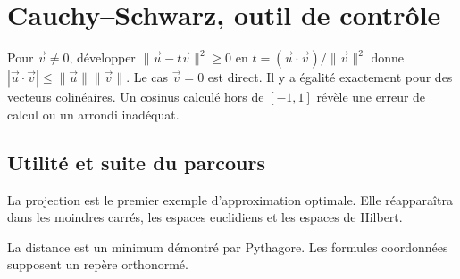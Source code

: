 \documentclass[../cours_tle.tex]{subfiles}
\begin{document}
\section{Cauchy--Schwarz, outil de contrôle}
Pour $\vec v\ne0$, développer $\|\vec u-t\vec v\|^2\ge0$ en
$t=(\vec u\cdot\vec v)/\|\vec v\|^2$ donne
$|\vec u\cdot\vec v|\le\|\vec u\|\|\vec v\|$. Le cas $\vec v=0$ est direct.
Il y a égalité exactement pour des vecteurs colinéaires. Un cosinus calculé hors de $[-1,1]$ révèle une erreur de calcul ou un arrondi inadéquat.
\begin{finchapitre}
\section{Utilité et suite du parcours}
La projection est le premier exemple d'approximation optimale. Elle réapparaîtra dans les moindres carrés, les espaces euclidiens et les espaces de Hilbert.
\begin{retenir}
La distance est un minimum démontré par Pythagore. Les formules coordonnées supposent un repère orthonormé.
\end{retenir}
\end{finchapitre}
\end{document}
